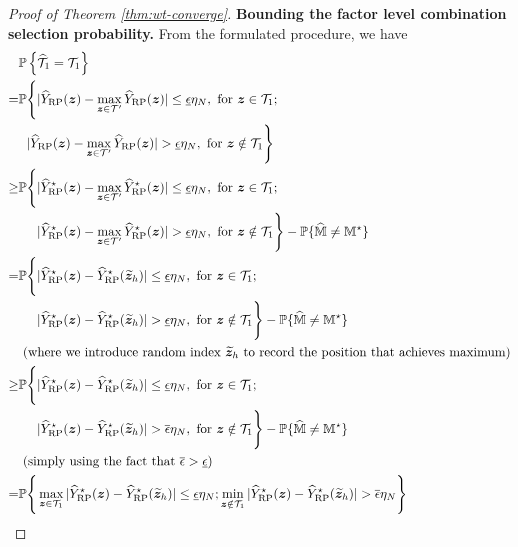 \documentclass[12pt]{article}
\begin{document}
\begin{proof}[Proof of Theorem \ref{thm:wt-converge}]
    \textbf{Bounding the factor level combination selection probability.} From the formulated procedure, we have
    \begingroup
    \allowdisplaybreaks
    \begin{align*}
        &\bbP\lt\{\hat{\cT}_{1} = {\cT}_{1} \rt\} \\
        = & \bbP\Bigg\{|\hY_{\operatorname{RP}}(\bz)-\max_{\bz\in\cT'}\hY_{\operatorname{RP}}(\bz)| \le \underline{\epsilon}\eta_N ,  \text{ for }\bz\in\cT_{1} ; \\
        &\phantom{ \bbP } |\hY_{\operatorname{RP}}(\bz)-\max_{\bz\in\cT'}\hY_{\operatorname{RP}}(\bz)| > \underline{\epsilon}\eta_N ,  \text{ for }\bz\notin\cT_{1}\Bigg\} \\
        \ge & \bbP\Bigg\{  |\hY^\star_{\operatorname{RP}}(\bz)-\max_{\bz\in\cT'}\hY^\star_{\operatorname{RP}}(\bz)| \le \underline{\epsilon}\eta_N ,  \text{ for }\bz\in\cT_{1} ; \\
        &\phantom{ \bbP\Bigg\{  } |\hY^\star_{\operatorname{RP}}(\bz)-\max_{\bz\in\cT'}\hY^\star_{\operatorname{RP}}(\bz)| > \underline{\epsilon}\eta_N ,  \text{ for }\bz\notin\cT_{1}\Bigg\} - \bbP\{\hat{\bbM}\neq \bbM^\star\}\\
        = & \bbP\Bigg\{    |\hY^\star_{\operatorname{RP}}(\bz)-\hY^\star_{\operatorname{RP}}(\tilde{\bz}_h)| \le \underline{\epsilon}\eta_N ,  \text{ for }\bz\in\cT_{1} ; \\
        &\phantom{ \bbP\Bigg\{  } |\hY^\star_{\operatorname{RP}}(\bz)-\hY^\star_{\operatorname{RP}}(\tilde{\bz}_h)| > \underline{\epsilon}\eta_N ,  \text{ for }\bz\notin\cT_{1}\Bigg\}  - \bbP\{\hat{\bbM}\neq \bbM^\star\}\\
        &\see{where we introduce random index $\tilde{\bz}_h$ to record the position that achieves maximum} \\
       \ge & \bbP\Bigg\{    |\hY^\star_{\operatorname{RP}}(\bz)-\hY^\star_{\operatorname{RP}}(\tilde{\bz}_h)| \le \underline{\epsilon}\eta_N ,  \text{ for }\bz\in\cT_{1} ; \\
        &\phantom{ \bbP\Bigg\{  } |\hY^\star_{\operatorname{RP}}(\bz)-\hY^\star_{\operatorname{RP}}(\tilde{\bz}_h)| > \overline{\epsilon}\eta_N ,  \text{ for }\bz\notin\cT_{1}\Bigg\}  - \bbP\{\hat{\bbM}\neq \bbM^\star\}\\
        &\see{simply using the fact that $\overline{\epsilon} > \underline{\epsilon}$} \\
        = & \bbP\Bigg\{    \max_{\bz\in\cT_{1}}|\hY^\star_{\operatorname{RP}}(\bz)-\hY^\star_{\operatorname{RP}}(\tilde{\bz}_h)| \le \underline{\epsilon}\eta_N;  \min_{\bz\notin\cT_{1}}|\hY^\star_{\operatorname{RP}}(\bz)-\hY^\star_{\operatorname{RP}}(\tilde{\bz}_h)| > \overline{\epsilon}\eta_N\Bigg\} \\

\end{align*}
\end{proof}
\end{document}
